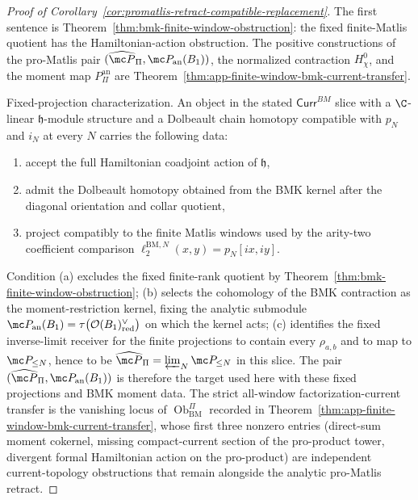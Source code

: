 \begin{proof}[Proof of Corollary~\ref{cor:promatlis-retract-compatible-replacement}]
  The first sentence is Theorem~\ref{thm:bmk-finite-window-obstruction}: the
  fixed finite-Matlis quotient has the Hamiltonian-action obstruction.  The
  positive constructions of the pro-Matlis pair \((\widehat{\mc
  P}_{\Pi},\mc P_{\mathrm{an}}(B_1))\), the normalized contraction
  \(H_\chi^0\), and the moment map \(P_{\Pi}^{\mathrm{an}}\) are
  Theorem~\ref{thm:app-finite-window-bmk-current-transfer}.

  Fixed-projection characterization.  An object in the stated
  \(\mathsf{Curr}^{BM}\) slice with a \(\C\)-linear
  \(\mathfrak h\)-module structure and a Dolbeault chain homotopy
  compatible with \(p_N\) and \(i_N\) at every \(N\) carries the
  following data:
  \begin{enumerate}[label=(\alph*)]
    \item accept the full Hamiltonian coadjoint action of
      \(\mathfrak h\),
    \item admit the Dolbeault homotopy obtained from the BMK kernel
      after the diagonal orientation and collar quotient,
    \item project compatibly to the finite Matlis windows used by the
      arity-two coefficient comparison
      \(\ell^{\mathrm{BM},N}_2(x,y)=p_N[ix,iy]\).
  \end{enumerate}
  Condition (a) excludes the fixed finite-rank quotient by
  Theorem~\ref{thm:bmk-finite-window-obstruction}; (b) selects the
  cohomology of the BMK contraction as the moment-restriction kernel,
  fixing the analytic submodule
  \(\mc P_{\mathrm{an}}(B_1)=\tau\bigl(\mathcal O(B_1)^\vee_{\mathrm{red}}\bigr)\)
  on which the kernel acts; (c) identifies the fixed inverse-limit receiver
  for the finite projections to contain every \(\rho_{a,b}\) and to map
  to \(\mc P_{\leq N}\), hence to be
  \(\widehat{\mc P}_{\Pi}=\varprojlim_N\mc P_{\leq N}\) in this slice.
	  The pair \((\widehat{\mc P}_{\Pi},\mc P_{\mathrm{an}}(B_1))\) is
	  therefore the target used here with these fixed projections and BMK
	  moment data.  The strict all-window factorization-current transfer
	  is the vanishing locus of
	  \(\operatorname{Ob}^{\Pi}_{\mathrm{BM}}\) recorded in
  Theorem~\ref{thm:app-finite-window-bmk-current-transfer}, whose
  first three nonzero entries (direct-sum moment cokernel, missing
  compact-current section of the pro-product tower, divergent formal
  Hamiltonian action on the pro-product) are independent
  current-topology obstructions that remain alongside the analytic
  pro-Matlis retract.
\end{proof}

